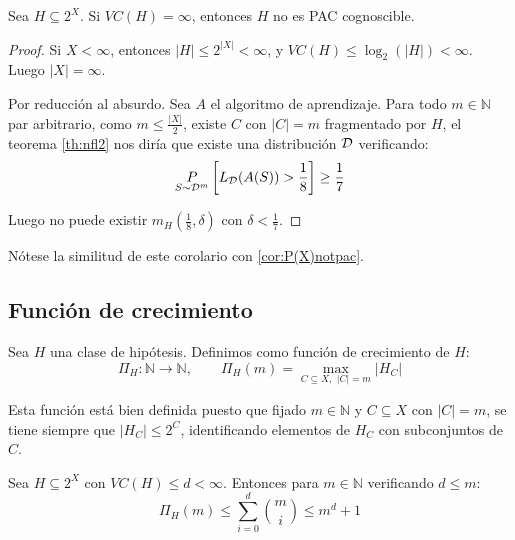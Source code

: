 \begin{corollary}
 Sea $H \subseteq 2^X$. Si $VC(H) = \infty$, entonces $H$ no es PAC cognoscible.
 \label{cor:vc-finito}
\end{corollary}

  \begin{proof}
  Si $X < \infty$, entonces $|H| \le 2^{|X|} < \infty$, y $VC(H) \le \log_2(|H|) < \infty$. Luego $|X| = \infty$.
  
  Por reducción al absurdo. Sea $A$ el algoritmo de aprendizaje. Para todo $m\in \mathbb{N}$ par arbitrario, como 
  $m\le \frac{|X|}{2}$, existe $C$ con $|C| = m$ fragmentado por $H$, el teorema \ref{th:nfl2} nos diría que existe una 
  distribución $\mathcal{D}$ verificando:
  \[
    \underset{S\sim \mathcal{D}^m}{P} \left[ L_{\mathcal{D}}(A(S)) > \frac{1}{8} \right] \ge \frac{1}{7}
  \]
 
  Luego no puede existir $m_H \left(\frac{1}{8}, \delta\right)$ con $\delta < \frac{1}{7}$.
  \end{proof}

Nótese la similitud de este corolario con \ref{cor:P(X)notpac}.

\subsection{Función de crecimiento}
\begin{definition}
Sea $H$ una clase de hipótesis. Definimos como función de crecimiento de $H$:
\[
  \Pi_{H}: \mathbb{N} \longrightarrow \mathbb{N}, \qquad \Pi_{H}(m) = \max_{C \subseteq X, \,\, |C|=m} |H_C|
\]
\end{definition}

Esta función está bien definida puesto que fijado $m \in \mathbb{N}$ y $C\subseteq X$ con $|C| = m$, se tiene siempre 
que $|H_C| \le 2^C$, identificando elementos de $H_C$ con subconjuntos de $C$.

\begin{lemma}
Sea $H \subseteq 2^X$ con $VC(H) \le d < \infty$. Entonces para $m\in \mathbb{N}$ verificando $d\le m$:
\[
  \Pi_{H} (m) \le \sum_{i=0}^d \binom{m}{i} \le m^d + 1
\]
\label{lemma:sauer}
\end{lemma}


